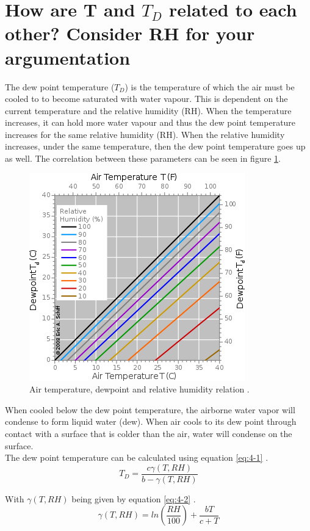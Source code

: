 \documentclass{article}
\begin{document}
\section{How are T and $T_D$ related to each other? Consider RH for your argumentation}
The dew point temperature ($T_D$) is the temperature of which the air must be cooled to to become saturated with water vapour. This is dependent on the current temperature and the relative humidity (RH). When the temperature increases, it can hold more water vapour and thus the dew point temperature increases for the same relative humidity (RH). When the relative humidity increases, under the same temperature, then the dew point temperature goes up as well. The correlation between these parameters can be seen in figure \ref{fig:Q4}.\\

\begin{figure}[H]
	\centering
	\includegraphics[width=.5\textwidth]{figures/Dewpoint-RH.png}
	\caption{Air temperature, dewpoint and relative humidity relation \cite{wikiQ4}.}
	\label{fig:Q4}
\end{figure}

When cooled below the dew point temperature, the airborne water vapor will condense to form liquid water (dew). When air cools to its dew point through contact with a surface that is colder than the air, water will condense on the surface.\\

The dew point temperature can be calculated using equation \ref{eq:4-1} \cite{wikiQ4}.
\begin{equation}
T_D = \frac{c \gamma (T, RH)}{b - \gamma (T, RH)} \label{eq:4-1}
\end{equation}

With $\gamma (T, RH)$ being given by equation \ref{eq:4-2} \cite{wikiQ4}.
\begin{equation}
\gamma (T, RH) = ln \left( \frac{RH}{100} \right) + \frac{bT}{c + T} \label{eq:4-2}
\end{equation}
\end{document}
